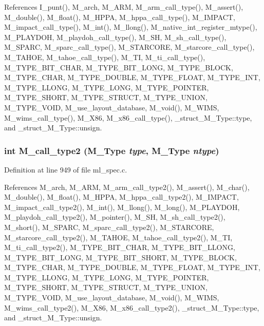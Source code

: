 References I\_\-punt(), M\_\-arch, M\_\-ARM, M\_\-arm\_\-call\_\-type(), M\_\-assert(), M\_\-double(), M\_\-float(), M\_\-HPPA, M\_\-hppa\_\-call\_\-type(), M\_\-IMPACT, M\_\-impact\_\-call\_\-type(), M\_\-int(), M\_\-llong(), M\_\-native\_\-int\_\-register\_\-mtype(), M\_\-PLAYDOH, M\_\-playdoh\_\-call\_\-type(), M\_\-SH, M\_\-sh\_\-call\_\-type(), M\_\-SPARC, M\_\-sparc\_\-call\_\-type(), M\_\-STARCORE, M\_\-starcore\_\-call\_\-type(), M\_\-TAHOE, M\_\-tahoe\_\-call\_\-type(), M\_\-TI, M\_\-ti\_\-call\_\-type(), M\_\-TYPE\_\-BIT\_\-CHAR, M\_\-TYPE\_\-BIT\_\-LONG, M\_\-TYPE\_\-BLOCK, M\_\-TYPE\_\-CHAR, M\_\-TYPE\_\-DOUBLE, M\_\-TYPE\_\-FLOAT, M\_\-TYPE\_\-INT, M\_\-TYPE\_\-LLONG, M\_\-TYPE\_\-LONG, M\_\-TYPE\_\-POINTER, M\_\-TYPE\_\-SHORT, M\_\-TYPE\_\-STRUCT, M\_\-TYPE\_\-UNION, M\_\-TYPE\_\-VOID, M\_\-use\_\-layout\_\-database, M\_\-void(), M\_\-WIMS, M\_\-wims\_\-call\_\-type(), M\_\-X86, M\_\-x86\_\-call\_\-type(), \_\-struct\_\-M\_\-Type::type, and \_\-struct\_\-M\_\-Type::unsign.
\subsubsection{\setlength{\rightskip}{0pt plus 5cm}int M\_\-call\_\-type2 (\bf{M\_\-Type} {\em type}, \bf{M\_\-Type} {\em ntype})}\label{m__spec_8h_c6d8e30b58131897fc7381b8e2e8d332}




Definition at line 949 of file ml\_\-spec.c.

References M\_\-arch, M\_\-ARM, M\_\-arm\_\-call\_\-type2(), M\_\-assert(), M\_\-char(), M\_\-double(), M\_\-float(), M\_\-HPPA, M\_\-hppa\_\-call\_\-type2(), M\_\-IMPACT, M\_\-impact\_\-call\_\-type2(), M\_\-int(), M\_\-llong(), M\_\-long(), M\_\-PLAYDOH, M\_\-playdoh\_\-call\_\-type2(), M\_\-pointer(), M\_\-SH, M\_\-sh\_\-call\_\-type2(), M\_\-short(), M\_\-SPARC, M\_\-sparc\_\-call\_\-type2(), M\_\-STARCORE, M\_\-starcore\_\-call\_\-type2(), M\_\-TAHOE, M\_\-tahoe\_\-call\_\-type2(), M\_\-TI, M\_\-ti\_\-call\_\-type2(), M\_\-TYPE\_\-BIT\_\-CHAR, M\_\-TYPE\_\-BIT\_\-LLONG, M\_\-TYPE\_\-BIT\_\-LONG, M\_\-TYPE\_\-BIT\_\-SHORT, M\_\-TYPE\_\-BLOCK, M\_\-TYPE\_\-CHAR, M\_\-TYPE\_\-DOUBLE, M\_\-TYPE\_\-FLOAT, M\_\-TYPE\_\-INT, M\_\-TYPE\_\-LLONG, M\_\-TYPE\_\-LONG, M\_\-TYPE\_\-POINTER, M\_\-TYPE\_\-SHORT, M\_\-TYPE\_\-STRUCT, M\_\-TYPE\_\-UNION, M\_\-TYPE\_\-VOID, M\_\-use\_\-layout\_\-database, M\_\-void(), M\_\-WIMS, M\_\-wims\_\-call\_\-type2(), M\_\-X86, M\_\-x86\_\-call\_\-type2(), \_\-struct\_\-M\_\-Type::type, and \_\-struct\_\-M\_\-Type::unsign.
